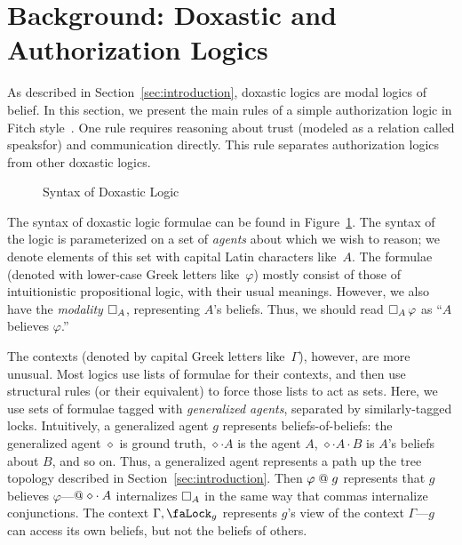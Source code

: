 \section{Background: Doxastic and Authorization Logics}
\label{sec:backgr-doxast-auth}

As described in Section~\ref{sec:introduction}, doxastic logics are modal logics of belief.
In this section, we present the main rules of a simple authorization logic in Fitch style~\cite{Clouston18}.
One rule requires reasoning about trust (modeled as a relation called \textsf{speaksfor}) and communication directly.
This rule separates authorization logics from other doxastic logics.

\begin{figure}
  \centering
  \begin{syntax}
     \alternative{\diamond} 
    \category[Formulae]{\varphi, \psi}
      \alternative{\top}
      \alternative{\bot}
      \alternative{\varphi \land \psi}
      \alternative{\varphi \lor \psi}
      \alternative{\varphi \to \psi}
    \category[Contexts]{\Gamma, \Delta}
      \alternative{\cdot}
  \end{syntax}
  
  \caption{Syntax of Doxastic Logic}
  \label{fig:dox-syn}
\end{figure}

The syntax of doxastic logic formulae can be found in Figure~\ref{fig:dox-syn}.
The syntax of the logic is parameterized on a set of \emph{agents} about which we wish to reason; we denote elements of this set with capital Latin characters like~$A$.
The formulae (denoted with lower-case Greek letters like~$\varphi$) mostly consist of those of intuitionistic propositional logic, with their usual meanings.
However, we also have the \emph{modality} $\mathop{\square_{A}} $, representing $A$'s beliefs.
Thus, we should read $\mathop{\square_{A}} \varphi$ as ``$A$ believes $\varphi$.''

The contexts (denoted by capital Greek letters like~$\Gamma$), however, are more unusual.
Most logics use lists of formulae for their contexts, and then use structural rules (or their equivalent) to force those lists to act as sets.
Here, we use sets of formulae tagged with \emph{generalized agents}, separated by similarly-tagged locks.
Intuitively, a generalized agent $g$ represents beliefs-of-beliefs: the generalized agent $\diamond$ is ground truth, $\diamond \cdot A$ is the agent $A$, $\diamond \cdot A \cdot B$ is $A$'s beliefs about $B$, and so on.
Thus, a generalized agent represents a path up the tree topology described in Section~\ref{sec:introduction}.
Then $\varphi \mathrel{@} g$ represents that $g$ believes $\varphi$---$\!\!{}\mathrel{@} \diamond \cdot A$ internalizes $\mathop{\square_{A}} $ in the same way that commas internalize conjunctions.
The context $\Gamma, \lock_g$ represents $g$'s view of the context $\Gamma$---$g$ can access its own beliefs, but not the beliefs of others.

